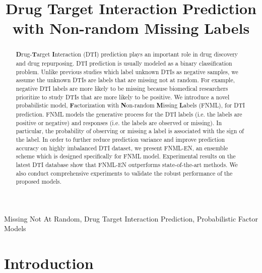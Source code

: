\documentclass[conference]{IEEEtran}
\begin{document}
\title{Drug Target Interaction Prediction with Non-random Missing Labels}

\maketitle

\begin{abstract}\textbf{D}rug-\textbf{T}arget \textbf{I}nteraction (DTI) prediction plays an important role in drug discovery and drug repurposing. DTI prediction is usually modeled as a binary classification problem. Unlike previous studies which label unknown DTIs as negative samples, we assume the unknown DTIs are labels that are missing not at random. For example, negative DTI labels are more likely to be missing because biomedical researchers prioritize to study DTIs that are more likely to be positive. We introduce a novel probabilistic model, \textbf{F}actorization with \textbf{N}on-random \textbf{M}issing \textbf{L}abels (FNML), for DTI prediction.  FNML models the generative process for the DTI labels (i.e. the labels are positive or negative) and responses (i.e. the labels are observed or missing). In particular, the probability of observing or missing a label is associated with the sign of the label. In order to further reduce prediction variance and improve prediction accuracy on highly imbalanced DTI dataset, we present FNML-EN, an ensemble scheme which is designed specifically for FNML model. Experimental results on the latest DTI database show that FNML-EN outperforms state-of-the-art methods. We also conduct comprehensive experiments to validate the robust performance of the proposed models.
\end{abstract}

\begin{IEEEkeywords}
Missing Not At Random, Drug Target Interaction Prediction, Probabilistic Factor Models
\end{IEEEkeywords}

\section{Introduction}
\end{document}
